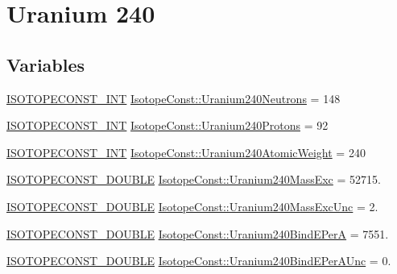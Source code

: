 \hypertarget{group___isotope_const-_uranium-_u240}{}\section{Uranium 240}
\label{group___isotope_const-_uranium-_u240}
\subsection*{Variables}
\begin{DoxyCompactItemize}
\item 
\mbox{\hyperlink{group___isotope_const-_macros_ga5f18360b3e99483a35c32d789e62621c}{I\+S\+O\+T\+O\+P\+E\+C\+O\+N\+S\+T\+\_\+\+I\+NT}} \mbox{\hyperlink{group___isotope_const-_uranium-_u240_gaf498a66faff9a0646d9d7b2373b37f6f}{Isotope\+Const\+::\+Uranium240\+Neutrons}} = 148
\item 
\mbox{\hyperlink{group___isotope_const-_macros_ga5f18360b3e99483a35c32d789e62621c}{I\+S\+O\+T\+O\+P\+E\+C\+O\+N\+S\+T\+\_\+\+I\+NT}} \mbox{\hyperlink{group___isotope_const-_uranium-_u240_ga1bbeb25e50c88d3e51719cf07ed38bed}{Isotope\+Const\+::\+Uranium240\+Protons}} = 92
\item 
\mbox{\hyperlink{group___isotope_const-_macros_ga5f18360b3e99483a35c32d789e62621c}{I\+S\+O\+T\+O\+P\+E\+C\+O\+N\+S\+T\+\_\+\+I\+NT}} \mbox{\hyperlink{group___isotope_const-_uranium-_u240_ga9d2d6b7a178b9c7bf2d50c69dfe8799b}{Isotope\+Const\+::\+Uranium240\+Atomic\+Weight}} = 240
\item 
\mbox{\hyperlink{group___isotope_const-_macros_ga8f45a7272ce02c0b4c65c44636ed719a}{I\+S\+O\+T\+O\+P\+E\+C\+O\+N\+S\+T\+\_\+\+D\+O\+U\+B\+LE}} \mbox{\hyperlink{group___isotope_const-_uranium-_u240_gaa490832023f351774d4908e3a666e337}{Isotope\+Const\+::\+Uranium240\+Mass\+Exc}} = 52715.
\item 
\mbox{\hyperlink{group___isotope_const-_macros_ga8f45a7272ce02c0b4c65c44636ed719a}{I\+S\+O\+T\+O\+P\+E\+C\+O\+N\+S\+T\+\_\+\+D\+O\+U\+B\+LE}} \mbox{\hyperlink{group___isotope_const-_uranium-_u240_ga64d5d0fdd3eaf2da12e455974343e568}{Isotope\+Const\+::\+Uranium240\+Mass\+Exc\+Unc}} = 2.
\item 
\mbox{\hyperlink{group___isotope_const-_macros_ga8f45a7272ce02c0b4c65c44636ed719a}{I\+S\+O\+T\+O\+P\+E\+C\+O\+N\+S\+T\+\_\+\+D\+O\+U\+B\+LE}} \mbox{\hyperlink{group___isotope_const-_uranium-_u240_gaef241038e11a3162843a4c1ddfa9a670}{Isotope\+Const\+::\+Uranium240\+Bind\+E\+PerA}} = 7551.
\item 
\mbox{\hyperlink{group___isotope_const-_macros_ga8f45a7272ce02c0b4c65c44636ed719a}{I\+S\+O\+T\+O\+P\+E\+C\+O\+N\+S\+T\+\_\+\+D\+O\+U\+B\+LE}} \mbox{\hyperlink{group___isotope_const-_uranium-_u240_ga51481d0498b40f6afa76c35580a7512c}{Isotope\+Const\+::\+Uranium240\+Bind\+E\+Per\+A\+Unc}} = 0.

\end{DoxyCompactItemize}
